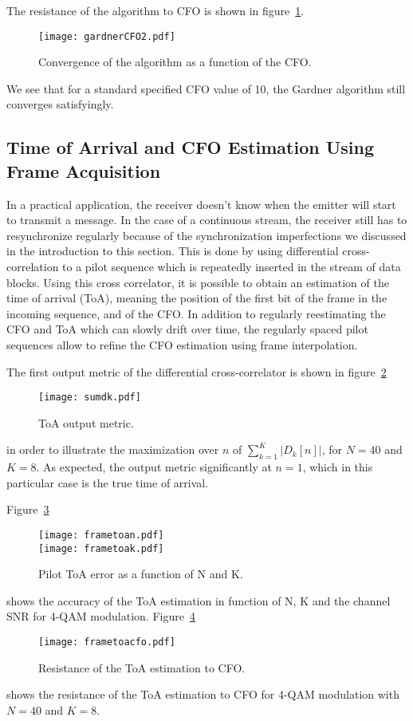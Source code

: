 The resistance of the algorithm to CFO is shown in figure~\ref{fig:gConvCFO}.
\begin{figure}[htbp]
    \centering
    \texttt{[image: gardnerCFO2.pdf]}
    \caption{Convergence of the algorithm as a function of the CFO.\label{fig:gConvCFO}}
\end{figure}
We see that for a standard specified CFO value of \SI{10}{\ppm}, the Gardner algorithm still converges satisfyingly.

\subsection{Time of Arrival and CFO Estimation Using Frame Acquisition}
In a practical application, the receiver doesn't know when the emitter will start to transmit a message.
In the case of a continuous stream, the receiver still has to resynchronize regularly because of the synchronization imperfections we discussed in the introduction to this section.
This is done by using differential cross-correlation to a pilot sequence which is repeatedly inserted in the stream of data blocks.
Using this cross correlator, it is possible to obtain an estimation of the time of arrival (ToA), meaning the position of the first bit of the frame in the incoming sequence, and of the CFO.
In addition to regularly reestimating the CFO and ToA which can slowly drift over time, the regularly spaced pilot sequences allow to refine the CFO estimation using frame interpolation.

The first output metric of the differential cross-correlator is shown in figure~\ref{fig:sumdk}
\begin{figure}
  \centering
  \texttt{[image: sumdk.pdf]}
  \caption{ToA output metric.\label{fig:sumdk}}
\end{figure}
in order to illustrate the maximization over $n$ of $\sum_{k=1}^K |D_k[n]|$, for $N=40$ and $K = 8$. As expected, the output metric significantly at $n = 1$, which in this particular case is the true time of arrival.

Figure~\ref{fig:frametoa}
\begin{figure}
  \centering
  \texttt{[image: frametoan.pdf]}
  \\\texttt{[image: frametoak.pdf]}
  \caption{Pilot ToA error as a function of N and K.\label{fig:frametoa}}
\end{figure}
shows the accuracy of the ToA estimation in function of N, K and the channel SNR for 4-QAM modulation.
Figure~\ref{fig:frametoacfo}
\begin{figure}
  \centering
  \texttt{[image: frametoacfo.pdf]}
  \caption{Resistance of the ToA estimation to CFO.\label{fig:frametoacfo}}
\end{figure}
shows the resistance of the ToA estimation to CFO for 4-QAM modulation with $N = 40$ and $K=8$.

